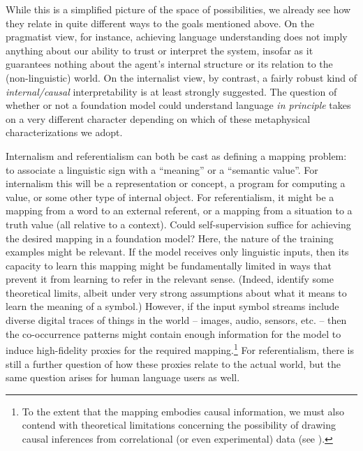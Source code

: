 While this is a simplified picture of the space of possibilities, we already see how they relate in quite different ways to the goals mentioned above. On the pragmatist view, for instance, achieving language understanding does not imply anything about our ability to trust or interpret the system, insofar as it guarantees nothing about the agent’s internal structure or its relation to the (non-linguistic) world. On the internalist view, by contrast, a fairly robust kind of \textit{internal/causal} interpretability is at least strongly suggested. The question of whether or not a foundation model could understand language \textit{in principle} takes on a very different character depending on which of these metaphysical characterizations we adopt.

Internalism and referentialism can both be cast as defining a mapping problem: to associate a linguistic sign with a ``meaning'' or a ``semantic value''. For internalism this will be a representation or concept, a program for computing a value, or some other type of internal object. For referentialism, it might be a mapping from a word to an external referent, or a mapping from a situation to a truth value (all relative to a context). Could self-supervision suffice for achieving the desired mapping in a foundation model? Here, the nature of the training examples might be relevant. If the model receives only linguistic inputs, then its capacity to learn this mapping might be fundamentally limited in ways that prevent it from learning to refer in the relevant sense. (Indeed, \citet{merrill2021provable} identify some theoretical limits, albeit under very strong assumptions about what it means to learn the meaning of a symbol.) However, if the input symbol streams include diverse digital traces of things in the world – images, audio, sensors, etc. – then the co-occurrence patterns might contain enough information for the model to induce high-fidelity proxies for the required mapping.\footnote{To the extent that the mapping embodies causal information, we must also contend with theoretical limitations concerning the possibility of drawing causal inferences from correlational  (or even experimental) data (see \citealt{Spirtes2001,BCII2020}).} For referentialism, there is still a further question of how these proxies relate to the actual world, but the same question arises for human language users as well.


